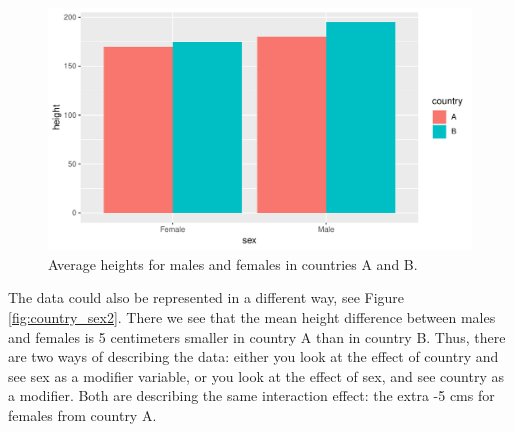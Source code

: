 \documentclass[]{book}\usepackage[]{graphicx}\usepackage[]{color}
\makeatletter
\def\maxwidth{ %
  \ifdim\Gin@nat@width>\linewidth
    \linewidth
  \else
    \Gin@nat@width
  \fi
}
\newenvironment{knitrout}{}{} %
\makeatother
\begin{document}
\begin{knitrout}
\color{fgcolor}\begin{figure}

{\centering \includegraphics[width=\maxwidth]{figure/country_sex1-1} 

}

\caption[Average heights for males and females in countries A and B]{Average heights for males and females in countries A and B.}\label{fig:country_sex1}
\end{figure}


\end{knitrout}


The data could also be represented in a different way, see Figure \ref{fig:country_sex2}. There we see that the mean height difference between males and females is 5 centimeters smaller in country A than in country B. Thus, there are two ways of describing the data: either you look at the effect of country and see sex as a modifier variable, or you look at the effect of sex, and see country as a modifier. Both are describing the same interaction effect: the extra -5 cms for females from country A.
\end{document}
